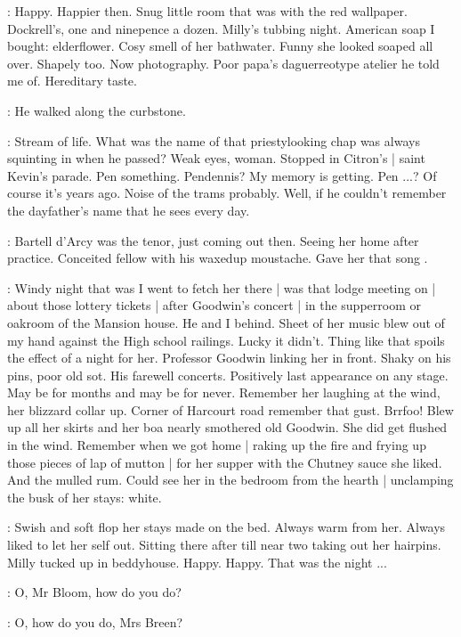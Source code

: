 \BloomInt:
Happy.
Happier then.
Snug little room that was with the red wallpaper.
Dockrell's, one and ninepence a dozen.
Milly's tubbing night.
American soap I bought:
elderflower.
Cosy smell of her bathwater.
Funny she looked soaped all over.
Shapely too.
Now photography.
Poor papa's daguerreotype atelier he told me of.
Hereditary taste.

:
He walked along the curbstone.

\BloomInt:
Stream of life.
What was the name of that priestylooking chap was always squinting in
when he passed?
Weak eyes, woman.
Stopped in Citron's |
saint Kevin's parade.
Pen something.
Pendennis?
My memory is getting.
Pen ...?
Of course it's years ago.
Noise of the trams probably.
Well, if he couldn't remember the dayfather's name
that he sees every day.

\BloomInt:
Bartell d'Arcy was the tenor,
just coming out then.
Seeing her home after practice.
Conceited fellow with his waxedup moustache.
Gave her that song
.

\BloomInt:
Windy night that was I went to fetch her there |
was that lodge meeting on |
about those lottery tickets |
after Goodwin's concert |
in the supperroom or oakroom of the Mansion house.
He and I behind.
Sheet of her music blew out of my hand
against the High school railings.
Lucky it didn't.
Thing like that spoils the effect of a night for her.
Professor Goodwin linking her in front.
Shaky on his pins,
poor old sot.
His farewell concerts.
Positively last appearance on any stage.
May be for months and may be for never.
Remember her laughing at the wind, her blizzard collar up.
Corner of Harcourt road remember that gust.
Brrfoo!
Blew up all her skirts and her boa nearly smothered old Goodwin.
She did get flushed in the wind.
Remember when we got home |
raking up the fire and frying up those pieces of lap of mutton |
for her supper with the Chutney sauce she liked.
And the mulled rum.
Could see her in the bedroom from the hearth |
unclamping the busk of her stays:
white.

\BloomInt:
Swish and soft flop her stays made on the bed.
Always warm from her.
Always liked to let her self out.
Sitting there after till near two taking out her hairpins.
Milly tucked up in beddyhouse.
Happy.
Happy.
That was the night ...

\josie:
O, Mr Bloom, how do you do?

\Bloom:
O, how do you do, Mrs Breen?

